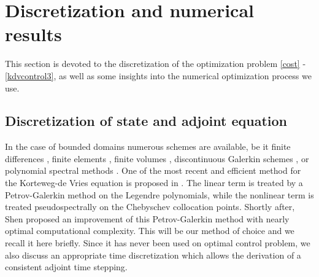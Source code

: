 \section{Discretization and numerical results}
\label{secnum}
This section is devoted to the discretization of the optimization problem \eqref{cost} - \eqref{kdvcontrol3}, as well as some insights into the numerical optimization process we use.
\subsection{Discretization of state and adjoint equation}
In the case of bounded domains numerous schemes are available, be it finite differences \cite{djidjeli1995numerical,zabusky1965interaction}, finite elements \cite{winther1980conservative,arnold1982superconvergent}, finite volumes \cite{dutykh2013finite}, discontinuous Galerkin schemes \cite{Bona1986859,yan2002local}, or polynomial spectral methods \cite{ma2000legendre,ma2001optimal,shen2003new}. One of the most recent and efficient method for the Korteweg-de Vries equation is proposed in \cite{ma2000legendre}. The linear term is treated by a Petrov-Galerkin method on the Legendre polynomials, while the nonlinear term is treated pseudospectrally on the Chebyschev collocation points. Shortly after, Shen \cite{shen2003new} proposed an improvement of this Petrov-Galerkin method with nearly optimal computational complexity. This will be our method of choice and we recall it here briefly. Since it has never been used on optimal control problem, we also discuss an appropriate time discretization which allows the derivation of a consistent adjoint time stepping.





